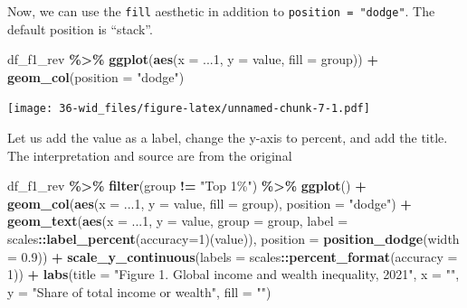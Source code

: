 \documentclass[
  xelatex, ja=standard]{bxjsbook}
\newenvironment{Shaded}{\begin{snugshade}}{\end{snugshade}}
\newcommand{\AttributeTok}[1]{\textcolor[rgb]{0.13,0.29,0.53}{#1}}
\newcommand{\DecValTok}[1]{\textcolor[rgb]{0.00,0.00,0.81}{#1}}
\newcommand{\FloatTok}[1]{\textcolor[rgb]{0.00,0.00,0.81}{#1}}
\newcommand{\FunctionTok}[1]{\textcolor[rgb]{0.13,0.29,0.53}{\textbf{#1}}}
\newcommand{\NormalTok}[1]{#1}
\newcommand{\SpecialCharTok}[1]{\textcolor[rgb]{0.81,0.36,0.00}{\textbf{#1}}}
\newcommand{\StringTok}[1]{\textcolor[rgb]{0.31,0.60,0.02}{#1}}
\theoremstyle{definition}
\theoremstyle{definition}
\theoremstyle{definition}
\theoremstyle{definition}
\theoremstyle{remark}
\begin{document}
Now, we can use the \texttt{fill} aesthetic in addition to \texttt{position\ =\ "dodge"}. The default position is ``stack''.

\begin{Shaded}
\begin{Highlighting}[]
\NormalTok{df\_f1\_rev }\SpecialCharTok{\%\textgreater{}\%} 
  \FunctionTok{ggplot}\NormalTok{(}\FunctionTok{aes}\NormalTok{(}\AttributeTok{x =}\NormalTok{ ...}\DecValTok{1}\NormalTok{, }\AttributeTok{y =}\NormalTok{ value, }\AttributeTok{fill =}\NormalTok{ group)) }\SpecialCharTok{+}
  \FunctionTok{geom\_col}\NormalTok{(}\AttributeTok{position =} \StringTok{"dodge"}\NormalTok{)}
\end{Highlighting}
\end{Shaded}

\texttt{[image: 36-wid\_files/figure-latex/unnamed-chunk-7-1.pdf]}

Let us add the value as a label, change the y-axis to percent, and add the title. The interpretation and source are from the original

\begin{Shaded}
\begin{Highlighting}[]
\NormalTok{df\_f1\_rev }\SpecialCharTok{\%\textgreater{}\%} \FunctionTok{filter}\NormalTok{(group }\SpecialCharTok{!=} \StringTok{"Top 1\%"}\NormalTok{) }\SpecialCharTok{\%\textgreater{}\%}
  \FunctionTok{ggplot}\NormalTok{() }\SpecialCharTok{+}
  \FunctionTok{geom\_col}\NormalTok{(}\FunctionTok{aes}\NormalTok{(}\AttributeTok{x =}\NormalTok{ ...}\DecValTok{1}\NormalTok{, }\AttributeTok{y =}\NormalTok{ value, }\AttributeTok{fill =}\NormalTok{ group), }\AttributeTok{position =} \StringTok{"dodge"}\NormalTok{) }\SpecialCharTok{+}
  \FunctionTok{geom\_text}\NormalTok{(}\FunctionTok{aes}\NormalTok{(}\AttributeTok{x =}\NormalTok{ ...}\DecValTok{1}\NormalTok{, }\AttributeTok{y =}\NormalTok{ value, }\AttributeTok{group =}\NormalTok{ group, }
            \AttributeTok{label =}\NormalTok{ scales}\SpecialCharTok{::}\FunctionTok{label\_percent}\NormalTok{(}\AttributeTok{accuracy=}\DecValTok{1}\NormalTok{)(value)), }
            \AttributeTok{position =} \FunctionTok{position\_dodge}\NormalTok{(}\AttributeTok{width =} \FloatTok{0.9}\NormalTok{)) }\SpecialCharTok{+} 
  \FunctionTok{scale\_y\_continuous}\NormalTok{(}\AttributeTok{labels =}\NormalTok{ scales}\SpecialCharTok{::}\FunctionTok{percent\_format}\NormalTok{(}\AttributeTok{accuracy =} \DecValTok{1}\NormalTok{)) }\SpecialCharTok{+}
  \FunctionTok{labs}\NormalTok{(}\AttributeTok{title =} \StringTok{"Figure 1. Global income and wealth inequality, 2021"}\NormalTok{,}
       \AttributeTok{x =} \StringTok{""}\NormalTok{, }\AttributeTok{y =} \StringTok{"Share of total income or wealth"}\NormalTok{, }\AttributeTok{fill =} \StringTok{""}\NormalTok{)}
\end{Highlighting}
\end{Shaded}
\end{document}
